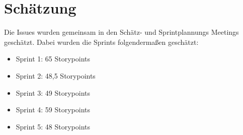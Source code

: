 \chapter{Schätzung}

Die Issues wurden gemeinsam in den Schätz- und Sprintplannungs Meetings geschätzt. Dabei wurden die Sprints folgendermaßen geschätzt:
\begin{itemize}
\item Sprint 1: 65 Storypoints
\item Sprint 2: 48,5 Storypoints
\item Sprint 3: 49 Storypoints
\item Sprint 4: 59 Storypoints
\item Sprint 5: 48 Storypoints
\end{itemize}